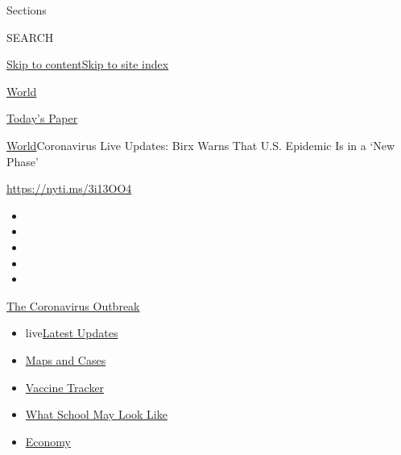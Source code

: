 Sections

SEARCH

\protect\hyperlink{site-content}{Skip to
content}\protect\hyperlink{site-index}{Skip to site index}

\href{https://www.nytimes3xbfgragh.onion/section/world}{World}

\href{https://myaccount.nytimes3xbfgragh.onion/auth/login?response_type=cookie\&client_id=vi}{}

\href{https://www.nytimes3xbfgragh.onion/section/todayspaper}{Today's
Paper}

\href{/section/world}{World}\textbar{}Coronavirus Live Updates: Birx
Warns That U.S. Epidemic Is in a `New Phase'

\url{https://nyti.ms/3i13OO4}

\begin{itemize}
\item
\item
\item
\item
\item
\end{itemize}

\href{https://www.nytimes3xbfgragh.onion/news-event/coronavirus?action=click\&pgtype=Article\&state=default\&region=TOP_BANNER\&context=storylines_menu}{The
Coronavirus Outbreak}

\begin{itemize}
\tightlist
\item
  live\href{https://www.nytimes3xbfgragh.onion/2020/08/02/world/coronavirus-updates.html?action=click\&pgtype=Article\&state=default\&region=TOP_BANNER\&context=storylines_menu}{Latest
  Updates}
\item
  \href{https://www.nytimes3xbfgragh.onion/interactive/2020/us/coronavirus-us-cases.html?action=click\&pgtype=Article\&state=default\&region=TOP_BANNER\&context=storylines_menu}{Maps
  and Cases}
\item
  \href{https://www.nytimes3xbfgragh.onion/interactive/2020/science/coronavirus-vaccine-tracker.html?action=click\&pgtype=Article\&state=default\&region=TOP_BANNER\&context=storylines_menu}{Vaccine
  Tracker}
\item
  \href{https://www.nytimes3xbfgragh.onion/interactive/2020/07/29/us/schools-reopening-coronavirus.html?action=click\&pgtype=Article\&state=default\&region=TOP_BANNER\&context=storylines_menu}{What
  School May Look Like}
\item
  \href{https://www.nytimes3xbfgragh.onion/live/2020/07/31/business/stock-market-today-coronavirus?action=click\&pgtype=Article\&state=default\&region=TOP_BANNER\&context=storylines_menu}{Economy}
\end{itemize}

